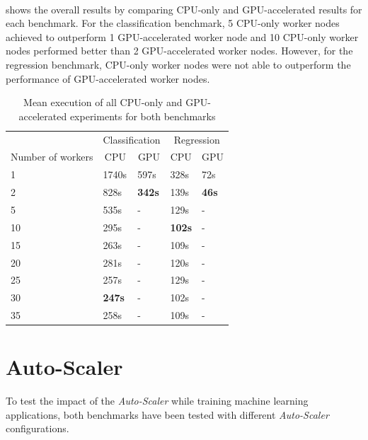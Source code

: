 \paragraph{}
 shows the overall results by comparing CPU-only and GPU-accelerated results for each benchmark.
For the classification benchmark, 5 CPU-only worker nodes achieved to outperform 1 GPU-accelerated worker node and 10 CPU-only worker nodes performed better than 2 GPU-accelerated worker nodes.
However, for the regression benchmark, CPU-only worker nodes were not able to outperform the performance of GPU-accelerated worker nodes.
\begin{table}[ht]
\centering
\begin{tabular}{@{}l|ll|ll@{}}
\toprule
                  & \multicolumn{2}{c|}{Classification}                & \multicolumn{2}{c}{Regression}                    \\
Number of workers & \multicolumn{1}{c}{CPU} & \multicolumn{1}{c|}{GPU} & \multicolumn{1}{c}{CPU} & \multicolumn{1}{c}{GPU} \\ \midrule
1  & 1740s & 597s & 328s & 72s \\
2  & 828s  & \textbf{342s} & 139s & \textbf{46s} \\
5  & 535s  & -      & 129s & -     \\
10 & 295s  & -      & \textbf{102s} & -     \\
15 & 263s  & -      & 109s & -     \\
20 & 281s  & -      & 120s & -     \\
25 & 257s  & -      & 129s & -     \\
30 & \textbf{247s}  & -      & 102s & -     \\
35 & 258s  & -      & 109s & -     \\ \bottomrule
\end{tabular}
\caption{Mean execution of all CPU-only and GPU-accelerated experiments for both benchmarks}
\label{table:07_gpu_overall_results}
\end{table}


\section{Auto-Scaler}
To test the impact of the \textit{Auto-Scaler} while training machine learning applications, both benchmarks have been tested with different \textit{Auto-Scaler} configurations. 


